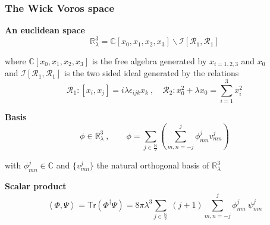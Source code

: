 \documentclass[9pt]{beamer}
\newcommand{\Smearip}[1]{\left\langle #1 \right\rangle} %
\begin{document}
\begin{frame}
 
\frametitle{The Wick Voros space} 

\vfill

\textbf{An euclidean space}
\vspace*{-10pt}
\begin{equation*}
\mathbb{R}^3_\lambda = \mathbb{C}[x_0,x_1,x_2,x_3] \backslash \mathcal{I}\left[\mathcal{R}_1,\mathcal{R}_1\right]
\end{equation*}

where $\mathbb{C}[x_0,x_1,x_2,x_3]$ is the free algebra generated by $x_{i=1,2,3}$ and $x_0$ \\
and $\mathcal{I}\left[\mathcal{R}_1,\mathcal{R}_1\right]$ is the two sided ideal generated by the relations
\vspace*{-10pt}
\begin{equation*}
\mathcal{R}_1 : [x_i,x_j] = i \lambda \epsilon_{ijk} x_k \ , \quad \mathcal{R}_2 : x_0^2 + \lambda x_0 = \sum_{i=1}^3 x_i^2
\end{equation*}

\vfill

\textbf{Basis}
\vspace*{-10pt}
\begin{equation*}
\phi \in \mathbb{R}^3_\lambda\ , \qquad \phi = \sum_{j\in\frac{\mathbb{N}}{2}} \left( \sum_{m,n=-j}^j \phi^j_{m n} v^j_{m n} \right)
\end{equation*}

with $\phi^j_{m n} \in \mathbb{C}$ and $\{v^j_{m n}\}$ the natural orthogonal basis of $\mathbb{R}^3_\lambda$
 
\vfill

\textbf{Scalar product}  
\vspace*{-10pt}
\begin{equation*}
\Smearip{\Phi,\Psi} = \mathsf{Tr}\left( \Phi^\dagger \Psi \right) = 8 \pi \lambda^3 \sum_{j\in\frac{\mathbb{N}}{2}} \ (j+1) \sum_{m,n=-j}^j \phi^j_{n m} \ \psi^j_{m n}
\end{equation*}

\end{frame}


\end{document}
